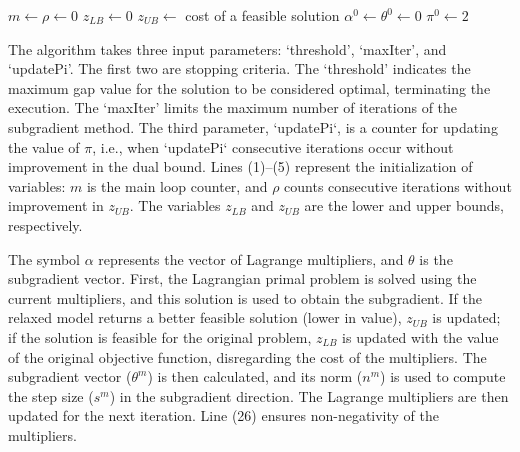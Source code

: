 \begin{algorithm}[!ht]
	\caption{\label{code:subgradient} Subgradient Method (Minimization Problem)}
	\SetAlgoLined
	$m \leftarrow \rho \leftarrow 0$\;
	$z_{LB} \leftarrow 0$\;
	$z_{UB} \leftarrow$ cost of a feasible solution\;
	$\alpha^{0} \leftarrow \theta^{0} \leftarrow 0$\; $\pi^{0} \leftarrow 2$\;

\end{algorithm}

The algorithm takes three input parameters: `threshold', `maxIter', and
`updatePi'. The first two are stopping criteria. The `threshold' indicates the
maximum gap value for the solution to be considered optimal, terminating the
execution. The `maxIter' limits the maximum number of iterations of the
subgradient method. The third parameter, `updatePi`, is a counter for updating
the value of $\pi$, i.e., when `updatePi` consecutive iterations occur without
improvement in the dual bound. Lines (1)–(5) represent the initialization of
variables: $m$ is the main loop counter, and $\rho$ counts consecutive
iterations without improvement in $z_{UB}$. The variables $z_{LB}$ and $z_{UB}$
are the lower and upper bounds, respectively.

The symbol $\alpha$ represents the vector of Lagrange multipliers, and $\theta$
is the subgradient vector. First, the Lagrangian primal problem is solved using
the current multipliers, and this solution is used to obtain the subgradient. If
the relaxed model returns a better feasible solution (lower in value), $z_{UB}$
is updated; if the solution is feasible for the original problem, $z_{LB}$ is
updated with the value of the original objective function, disregarding the cost
of the multipliers. The subgradient vector ($\theta^m$) is then calculated, and
its norm ($n^m$) is used to compute the step size ($s^m$) in the subgradient
direction. The Lagrange multipliers are then updated for the next iteration.
Line (26) ensures non-negativity of the multipliers.

